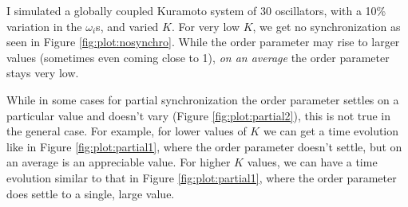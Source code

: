 \documentclass[12pt]{article}
\begin{document}
I simulated a globally coupled Kuramoto system of 30 oscillators, with a 10\% variation in the $\omega_i$s, and varied $K$. For very low $K$, we get no synchronization as seen in Figure \ref{fig:plot:nosynchro}. While the order parameter may rise to larger values (sometimes even coming close to 1), \emph{on an average} the order parameter stays very low.

While in some cases for partial synchronization the order parameter settles on a particular value and doesn't vary (Figure \ref{fig:plot:partial2}), this is not true in the general case. For example, for lower values of $K$ we can get a time evolution like in Figure \ref{fig:plot:partial1}, where the order parameter doesn't settle, but on an average is an appreciable value. For higher $K$ values, we can have a time evolution similar to that in Figure \ref{fig:plot:partial1}, where the order parameter does settle to a single, large value.
\end{document}
